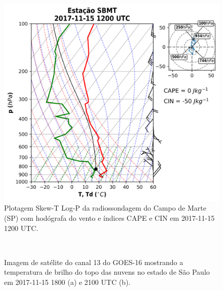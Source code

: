\newpage

\begin{figure}[hp]
	\begin{center}
		\caption{Plotagem Skew-T Log-P da radiossondagem do Campo de Marte (SP) com hodógrafa do vento e índices CAPE e CIN em 2017-11-15 1200 UTC.} 
		\label{sondagem_20171115}
		\includegraphics[width=0.75\columnwidth]{../Sounding_Processing/figures/sounding_SBMT2017111512UTC_ptbr.png}
	\end{center}
\end{figure}



\begin{figure}[hp]
	\begin{center}
		\caption{Imagem de satélite do canal 13 do GOES-16 mostrando a temperatura de brilho do topo das nuvens no estado de São Paulo em 2017-11-15 1800 (a) e 2100 UTC (b).} 
		\label{goes16_sp_20171115}
		 \\
	\end{center}
\end{figure}

